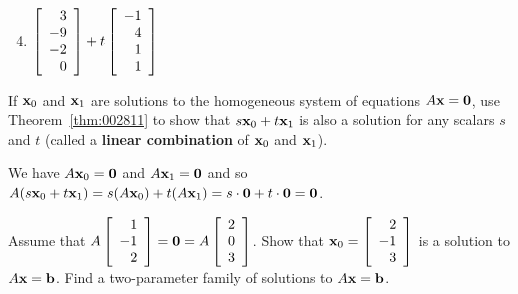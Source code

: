 \begin{multicols}{2}
\begin{ex}
\begin{sol}
\begin{enumerate}[label={\alph*.}]
\setcounter{enumi}{3}
\item
$\left[ \begin{array}{r}
3 \\
-9 \\
-2 \\
0
\end{array} \right] + t \left[ \begin{array}{r}
-1 \\
4 \\
1 \\
1
\end{array} \right]$


\end{enumerate}
\end{sol}
\end{ex}

\begin{ex}
If $\textbf{x}_{0}$ and $\textbf{x}_{1}$ are solutions to the homogeneous system of equations $A\textbf{x} = \textbf{0}$, use Theorem~\ref{thm:002811} to show that $s\textbf{x}_{0} + t\textbf{x}_{1}$ is also a solution for any scalars $s$ and $t$ (called a \textbf{linear combination} of $\textbf{x}_{0}$ and $\textbf{x}_{1}$).

\begin{sol}
We have $A\textbf{x}_{0} = \textbf{0}$ and $A\textbf{x}_{1} = \textbf{0}$ and so $A(s\textbf{x}_{0} + t\textbf{x}_{1}) = s(A\textbf{x}_{0}) + t(A\textbf{x}_{1}) = s \cdot \textbf{0} + t \cdot \textbf{0} = \textbf{0}$.
\end{sol}
\end{ex}

\begin{ex}
Assume that $A \left[ \begin{array}{r}
1 \\
-1 \\
2
\end{array} \right] = \textbf{0} = A \left[ \begin{array}{r}
2 \\
0 \\
3
\end{array} \right]$. Show that $\textbf{x}_{0} = \left[ \begin{array}{r}
2 \\
-1 \\
3
\end{array} \right]$ is a solution to $A\textbf{x} = \textbf{b}$. Find a two-parameter family of solutions to $A\textbf{x} = \textbf{b}$.
\end{ex}


\end{multicols}
